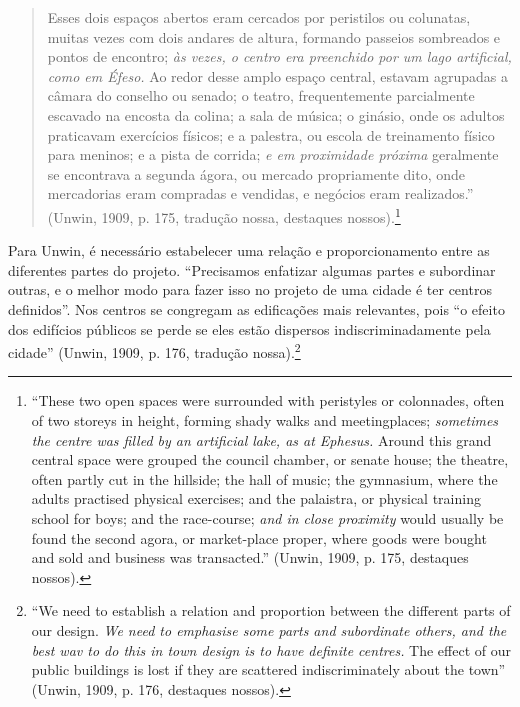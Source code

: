 \documentclass[12pt, a4paper]{book} %
\begin{document}
        \begin{quotation}
            Esses dois espaços abertos eram cercados por peristilos ou colunatas, muitas vezes com dois andares de altura, formando passeios sombreados e pontos de encontro; \textit{às vezes, o centro era preenchido por um lago artificial, como em Éfeso.} Ao redor desse amplo espaço central, estavam agrupadas a câmara do conselho ou senado; o teatro, frequentemente parcialmente escavado na encosta da colina; a sala de música; o ginásio, onde os adultos praticavam exercícios físicos; e a palestra, ou escola de treinamento físico para meninos; e a pista de corrida; \textit{e em proximidade próxima} geralmente se encontrava a segunda ágora, ou mercado propriamente dito, onde mercadorias eram compradas e vendidas, e negócios eram realizados.'' (Unwin, 1909, p. 175, tradução nossa, destaques nossos).\footnote[61]{``These two open spaces were surrounded with peristyles or colonnades, often of two storeys in height, forming shady walks and meetingplaces; \textit{sometimes the centre was filled by an artificial lake, as at Ephesus.} Around this grand central space were grouped the council chamber, or senate house; the theatre, often partly cut in the hillside; the hall of music; the gymnasium, where the adults practised physical exercises; and the palaistra, or physical training school for boys; and the race-course; \textit{and in close proximity} would usually be found the second agora, or market-place proper, where goods were bought and sold and business was transacted.'' (Unwin, 1909, p. 175, destaques nossos).}
        \end{quotation}

        Para Unwin, é necessário estabelecer uma relação e proporcionamento entre as diferentes partes do projeto. ``Precisamos enfatizar algumas partes e subordinar outras, e o melhor modo para fazer isso no projeto de uma cidade é ter centros definidos''. Nos centros se congregam as edificações mais relevantes, pois ``o efeito dos edifícios públicos se perde se eles estão dispersos indiscriminadamente pela cidade'' (Unwin, 1909, p. 176, tradução nossa).\footnote[62]{``We need to establish a relation and proportion between the different parts of our design. \textit{We need to emphasise some parts and subordinate others, and the best wav to do this in town design is to have definite centres.} The effect of our public buildings is lost if they are scattered indiscriminately about the town'' (Unwin, 1909, p. 176, destaques nossos).}
\end{document}
